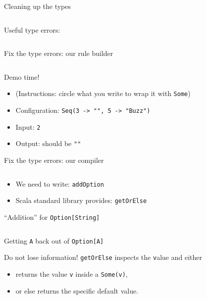 \begin{frame}[fragile]{Cleaning up the types}
  \inputminted[gobble=2]{scala}{FizzBuzz6.scala}

  Useful type errors:

  \inputminted[gobble=2]{console}{testQuick10.console}
\end{frame}

\begin{frame}[fragile]{Fix the type errors: our rule builder}
  \inputminted[gobble=2]{scala}{FizzBuzz7Rule.scala}

  \begin{block}{Demo time!}
    \begin{itemize}
    \item (Instructions: circle what you write to wrap it with \texttt{Some})
    \item Configuration: \texttt{Seq(3 -> "", 5 -> "Buzz")}
    \item Input: \texttt{2}
    \item Output: should be \texttt{""}
    \end{itemize}
  \end{block}
\end{frame}

\begin{frame}[fragile]{Fix the type errors: our compiler}
  \inputminted[gobble=2]{scala}{FizzBuzz7.scala}

  \begin{itemize}
  \item We need to write: \texttt{addOption}
  \item Scala standard library provides: \texttt{getOrElse}
  \end{itemize}
\end{frame}

\begin{frame}[fragile]{``Addition'' for \texttt{Option[String]}}
  \inputminted[gobble=2]{scala}{FizzBuzz8.scala}
\end{frame}

\begin{frame}[fragile]{Getting \texttt{A} back out of \texttt{Option[A]}}
  \begin{block}{Do not lose information!}
    \texttt{getOrElse} inspects the \texttt value and either
    \begin{itemize}
    \item returns the value \texttt{v} inside a \texttt{Some(v)},
    \item or else returns the specific default value.
    \end{itemize}
  \end{block}
\end{frame}


